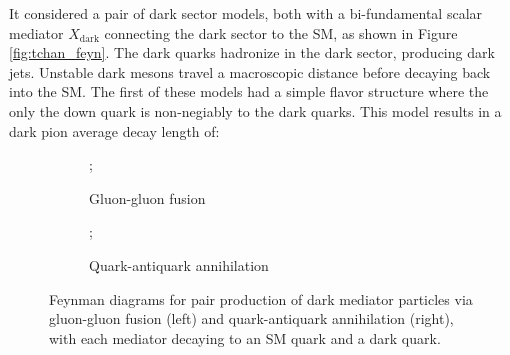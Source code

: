 

It considered a pair of dark sector models, both with a bi-fundamental scalar mediator $X_{\text{dark}}$ connecting the dark sector to the SM, as shown in Figure \ref{fig:tchan_feyn}. The dark quarks hadronize in the dark sector, producing dark jets. Unstable dark mesons travel a macroscopic distance before decaying back into the SM. The first of these models had a simple flavor structure where the only the down quark is non-negiably to the dark quarks. This model results in a dark pion average decay length of:


\begin{figure}[h] %
	\centering
	\begin{subfigure}{0.45\textwidth}
		\centering
		;
		\caption{Gluon-gluon fusion}
	\end{subfigure}
	\hfill
	\begin{subfigure}{0.45\textwidth}
		\centering
		;
		\caption{Quark-antiquark annihilation}
	\end{subfigure}
	\caption{Feynman diagrams for pair production of dark mediator particles via gluon-gluon fusion (left) and quark-antiquark annihilation (right), with each mediator decaying to an SM quark and a dark quark.}
	\label{fig:feynman_diagrams}
\end{figure}

